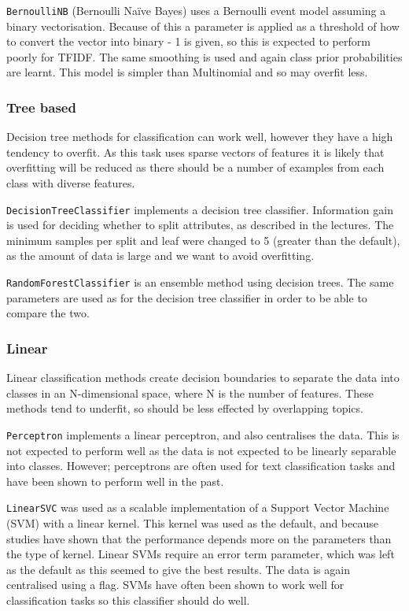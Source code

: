 \documentclass{article}
\begin{document}
\verb|BernoulliNB| (Bernoulli Na{\"i}ve Bayes) uses a Bernoulli event model assuming a binary vectorisation. Because of this a parameter is applied as a threshold of how to convert the vector into binary - 1 is given, so this is expected to perform poorly for TFIDF. The same smoothing is used and again class prior probabilities are learnt. This model is simpler than Multinomial and so may overfit less.

\subsubsection{Tree based}
Decision tree methods for classification can work well, however they have a high tendency to overfit. As this task uses sparse vectors of features it is likely that overfitting will be reduced as there should be a number of examples from each class with diverse features.

\verb|DecisionTreeClassifier| implements a decision tree classifier. Information gain is used for deciding whether to split attributes, as described in the lectures. The minimum samples per split and leaf were changed to 5 (greater than the default), as the amount of data is large and we want to avoid overfitting.

\verb|RandomForestClassifier| is an ensemble method using decision trees. The same parameters are used as for the decision tree classifier in order to be able to compare the two.

\subsubsection{Linear}
Linear classification methods create decision boundaries to separate the data into classes in an N-dimensional space, where N is the number of features. These methods tend to underfit, so should be less effected by overlapping topics.

\verb|Perceptron| implements a linear perceptron, and also centralises the data. This is not expected to perform well as the data is not expected to be linearly separable into classes. However; perceptrons are often used for text classification tasks and have been shown to perform well in the past.

\verb|LinearSVC| was used as a scalable implementation of a Support Vector Machine (SVM) with a linear kernel. This kernel was used as the default, and because studies have shown that the performance depends more on the parameters than the type of kernel. Linear SVMs require an error term parameter, which was left as the default as this seemed to give the best results. The data is again centralised using a flag. SVMs have often been shown to work well for classification tasks so this classifier should do well.
\end{document}
